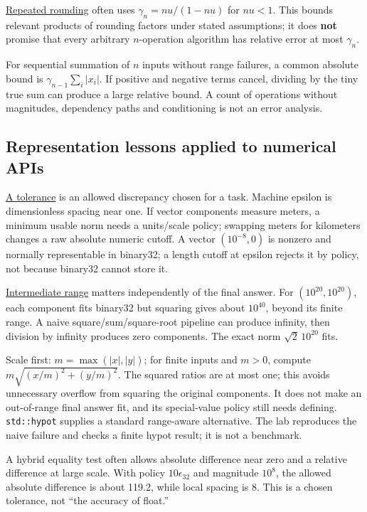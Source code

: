 \hyperref[appendix-f82e270791c8]{Repeated rounding} often uses \(\gamma_n=nu/(1-nu)\) for \(nu<1\). This bounds relevant products of rounding factors under stated assumptions; it does \textbf{not} promise that every arbitrary \(n\)-operation algorithm has relative error at most \(\gamma_n\).

For sequential summation of \(n\) inputs without range failures, a common absolute bound is \(\gamma_{n-1}\sum_i|x_i|\). If positive and negative terms cancel, dividing by the tiny true sum can produce a large relative bound. A count of operations without magnitudes, dependency paths and conditioning is not an error analysis.

\subsection{Representation lessons applied to numerical APIs}\label{01-foundations-i-ch001-representation-lessons-applied-to-numerical-apis}

\hyperref[appendix-0ec599f8ba27]{A tolerance} is an allowed discrepancy chosen for a task. Machine epsilon is dimensionless spacing near one. If vector components measure meters, a minimum usable norm needs a units/scale policy; swapping meters for kilometers changes a raw absolute numeric cutoff. A vector \((10^{-8},0)\) is nonzero and normally representable in binary32; a length cutoff at epsilon rejects it by policy, not because binary32 cannot store it.

\hyperref[appendix-7f1e17dcafb1]{Intermediate range} matters independently of the final answer. For \((10^{20},10^{20})\), each component fits binary32 but squaring gives about \(10^{40}\), beyond its finite range. A naive square/sum/square-root pipeline can produce infinity, then division by infinity produces zero components. The exact norm \(\sqrt2\,10^{20}\) fits.

Scale first: \(m=\max(|x|,|y|)\); for finite inputs and \(m>0\), compute \(m\sqrt{(x/m)^2+(y/m)^2}\). The squared ratios are at most one; this avoids unnecessary overflow from squaring the original components. It does not make an out-of-range final answer fit, and its special-value policy still needs defining. \texttt{std::hypot} supplies a standard range-aware alternative. The lab reproduces the naive failure and checks a finite hypot result; it is not a benchmark.

A hybrid equality test often allows absolute difference near zero and a relative difference at large scale. With policy \(10\epsilon_{32}\) and magnitude \(10^8\), the allowed absolute difference is about 119.2, while local spacing is 8. This is a chosen tolerance, not ``the accuracy of float.''

